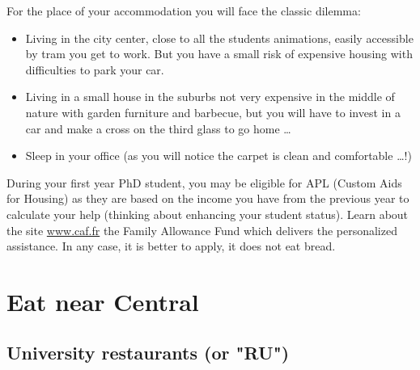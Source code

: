 For the place of your accommodation you will face the classic dilemma:
\begin{itemize}
  \item Living in the city center, close to all the students animations, easily accessible by tram you get to work. But you have a small risk of expensive housing with difficulties to park your car.
  \item Living in a small house in the suburbs not very expensive in the middle of nature with garden furniture and barbecue, but you will have to invest in a car and make a cross on the third glass to go home \dots
  \item Sleep in your office (as you will notice the carpet is clean and comfortable \dots!)
\end{itemize}

During your first year PhD student, you may be eligible for APL (Custom Aids for Housing) as they are based on the income you have from the previous year to calculate your help (thinking about enhancing your student status).
Learn about the site \url{www.caf.fr} the Family Allowance Fund which delivers the personalized assistance.
In any case, it is better to apply, it does not eat bread.

\section{Eat near Central}

\subsection{University restaurants (or "RU")}

